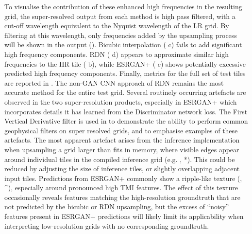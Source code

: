 \documentclass[manuscript.tex]{subfiles}
\begin{document}
To visualise the contribution of these enhanced high frequencies in the resulting grid, the super-resolved output from each method is high pass filtered, with a cut-off wavelength equivalent to the Nyquist wavelength of the LR grid.
By filtering at this wavelength, only frequencies added by the upsampling process will be shown in the output (). Bicubic interpolation ( c) fails to add significant high frequency components.
RDN\textdaggerdbl{} ( d) appears to approximate similar high frequencies to the HR tile ( b), while ESRGAN+ ( e) shows potentially excessive predicted high frequency components.
Finally, metrics for the full set of test tiles are reported in .
The non-GAN CNN approach of RDN\textdaggerdbl{} remains the most accurate method for the entire test grid.
Several routinely occurring artefacts are observed in the two super-resolution products, especially in ESRGAN+ which incorporates details it has learned from the Discriminator network loss.
The First Vertical Derivative filter is used in  to demonstrate the ability to perform common geophysical filters on super resolved grids, and to emphasise examples of these artefacts.
The most apparent artefact arises from the inference implementation when upsampling a grid larger than fits in memory, where visible edges appear around individual tiles in the compiled inference grid (e.g. , *).
This could be reduced by adjusting the size of inference tiles, or slightly overlapping adjacent input tiles.
Predictions from ESRGAN+ commonly show a ripple-like texture (, \^{ }), especially around pronounced high TMI features.
The effect of this texture occasionally reveals features matching the high-resolution groundtruth that are not predicted by the bicubic or RDN\textdaggerdbl{} upsampling, but the excess of “noisy” features present in ESRGAN+ predictions will likely limit its applicability when interpreting low-resolution grids with no corresponding groundtruth.
\end{document}
